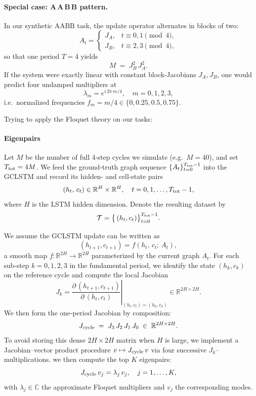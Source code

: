 \documentclass{article}
\theoremstyle{remark}
\theoremstyle{definition}
\begin{document}
\paragraph{Special case: A\,A\,B\,B pattern.}  
In our synthetic \(\mathrm{AAB B}\) task, the update operator alternates in blocks of two:
\[
  A_t = 
  \begin{cases}
    J_A,&t\equiv0,1\pmod4,\\
    J_B,&t\equiv2,3\pmod4,
  \end{cases}
\]
so that one period \(T=4\) yields
\[
  M \;=\;J_B^2\,J_A^2.
\]
If the system were exactly linear with constant block‐Jacobians \(J_A,J_B\), one would predict four undamped multipliers at
\[
  \lambda_{m}
  = e^{i\,2\pi\,m/4},
  \quad m=0,1,2,3,
\]
i.e.\ normalized frequencies \(f_m = m/4\in\{0,0.25,0.5,0.75\}\).

Trying to apply the Floquet theory on our tasks:

\paragraph{Eigenpairs}

Let \(M\) be the number of full 4‐step cycles we simulate (e.g.\ \(M=40\)), and set \(T_{\rm tot}=4M\).  We feed the ground‐truth graph sequence
\(\{A_t\}_{t=0}^{T_{\rm tot}-1}\) into the GCLSTM and record its hidden‐ and cell‐state pairs
\[
  (h_t,\,c_t)\in\mathbb{R}^H\times\mathbb{R}^H,
  \quad t=0,1,\dots,T_{\rm tot}-1,
\]
where \(H\) is the LSTM hidden dimension.  Denote the resulting dataset by
\[
  \mathcal{T}
  = \bigl\{\,(h_t,c_t)\bigr\}_{t=0}^{T_{\rm tot}-1}.
\]

We assume the GCLSTM update can be written as 
\[
  (h_{t+1},c_{t+1})
  = f(h_t,\,c_t;\,A_t),
\]
a smooth map \(f:\mathbb{R}^{2H}\to\mathbb{R}^{2H}\) parameterized by the current graph \(A_t\).  For each sub‐step \(k=0,1,2,3\) in the fundamental period, we identify the state
\((h_k,c_k)\) on the reference cycle and compute the local Jacobian
\[
  J_k
  =
  \left.\frac{\partial\,(h_{t+1},c_{t+1})}
               {\partial\,(h_t,c_t)}\right|_{(h_t,c_t)=(h_k,c_k)}
  \in \mathbb{R}^{2H\times 2H}.
\]
We then form the one‐period Jacobian by composition:
\begin{equation}
  J_{\rm cycle}
  \;=\;
  J_{3}\,J_{2}\,J_{1}\,J_{0}
  \;\in\;\mathbb{R}^{2H\times 2H}.
  \label{eq:Jcycle}
\end{equation}
To avoid storing this dense \(2H\times2H\) matrix when \(H\) is large, we implement a Jacobian–vector product procedure \(v\mapsto J_{\rm cycle}\,v\) via four successive \(J_k\)–multiplications.  we then compute the top \(K\) eigenpairs:
\[
  J_{\rm cycle}\,v_j = \lambda_j\,v_j,
  \quad j=1,\dots,K,
\]
with \(\lambda_j\in\mathbb{C}\) the approximate Floquet multipliers and \(v_j\) the corresponding modes.
\end{document}
